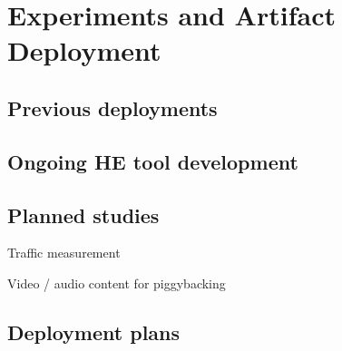 \section{Experiments and Artifact Deployment} 

\subsection{Previous deployments}

\subsection{Ongoing HE tool development}

\subsection{Planned studies}

Traffic measurement

Video / audio content for piggybacking

\subsection{Deployment plans}